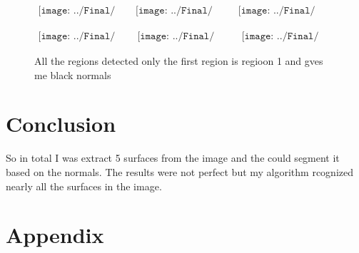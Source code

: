 \documentclass{article}
\begin{document}
\begin{figure}[h]
\begin{center}$
\begin{array}{llll}
\texttt{[image: ../Final/region1\_0.png]}&
\texttt{[image: ../Final/region2\_40.png]}&
\texttt{[image: ../Final/region3\_80.png]}
\end{array}$
\end{center}

\begin{center}$
\begin{array}{rrrr}
\texttt{[image: ../Final/region4\_120.png]}&
\texttt{[image: ../Final/regioon5\_160.png]}&
\texttt{[image: ../Final/region6\_200.png]}


\end{array}$
\end{center}
\caption{All the regions detected only the first region is regioon 1 and gves me black normals}
\label{pics:regions}
\end{figure}


\section{Conclusion}
So in total I was extract 5 surfaces from the image and the could segment it based on the normals. The results were not perfect but my algorithm rcognized nearly all the surfaces in the image.
\newpage

\section{Appendix}

\label{appendix: Appendix A}
\end{document}
